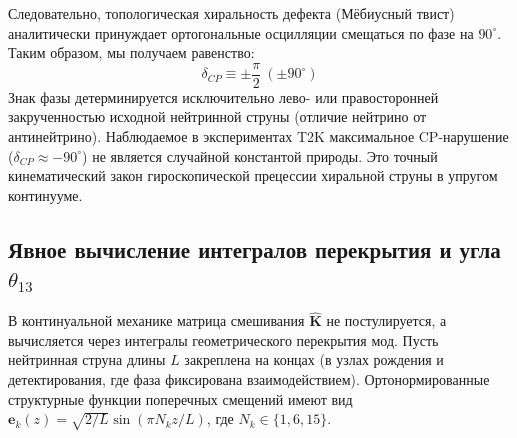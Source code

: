 \documentclass[12pt,a4paper]{article}
\begin{document}
	Следовательно, топологическая хиральность дефекта (Мёбиусный твист) аналитически принуждает ортогональные осцилляции смещаться по фазе на $90^\circ$. Таким образом, мы получаем равенство:
	\begin{equation}
		\delta_{CP} \equiv \pm \frac{\pi}{2} \ (\pm 90^\circ)
	\end{equation}
	Знак фазы детерминируется исключительно лево- или правосторонней закрученностью исходной нейтринной струны (отличие нейтрино от антинейтрино). Наблюдаемое в экспериментах T2K максимальное CP-нарушение ($\delta_{CP} \approx -90^\circ$) не является случайной константой природы. Это точный кинематический закон гироскопической прецессии хиральной струны в упругом континууме.
	
	\subsection{Явное вычисление интегралов перекрытия и угла $\theta_{13}$}
	В континуальной механике матрица смешивания $\hat{\mathbf{K}}$ не постулируется, а вычисляется через интегралы геометрического перекрытия мод. 
	Пусть нейтринная струна длины $L$ закреплена на концах (в узлах рождения и детектирования, где фаза фиксирована взаимодействием). Ортонормированные структурные функции поперечных смещений имеют вид $\mathbf{e}_k(z) = \sqrt{2/L} \sin(\pi N_k z / L)$, где $N_k \in \{1, 6, 15\}$.
	
\end{document}
